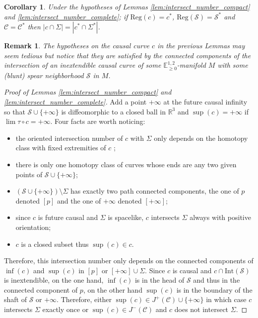 \documentclass[a4paper,12pt]{article}
\def\C{\mathcal C}
\def\S{\mathcal S}
\def\S{\mathcal{S}}
\def\RR{\mathbb{R}}
\newcommand{\mass}[1]{{\mathbb E}^{1,2}_{#1}}
\def\Reg{\mathrm{Reg}}
\def\reg{\Reg}
\newtheorem{corou}[lemou]{Corollary}
\newtheorem{remark}{Remark}             %
\begin{document}
    \begin{corou}\label{btzcor:intersect}\label{cor:intersect} Under the hypotheses of Lemmas \ref{lem:intersect_number_compact} and \ref{lem:intersect_number_complete}; if $\reg(c)=c^*$, $\reg(\S)=\S^*$ and $\C=\C^*$
    then $|c\cap \Sigma| = |c^*\cap\Sigma^*|$.
    \end{corou}
 \begin{remark}\label{btzrem:curve_spear}\label{rem:curve_spear} The hypotheses on the causal curve $c$ in the previous Lemmas may seem tedious but notice that they are satisfied by the connected components of the intersection of an inextendible causal curve of some $\mass{\geq0}$-manifold $M$ with some (blunt) spear neighborhood $\S$ in $M$. 
    \end{remark}
    \begin{proof}[Proof of Lemmas \ref{lem:intersect_number_compact} and \ref{lem:intersect_number_complete}]
     Add a point $+\infty$ at the future causal infinity so that $\S\cup\{+\infty\}$ is diffeomorphic to a closed ball in $\RR^3$ and $\sup(c)=+\infty$ if $\lim\tau\circ c = +\infty$. Four facts are worth noticing: 
     \begin{itemize}
      \item the oriented intersection number of $c$ with $\Sigma$ only depends on the homotopy class with fixed extremities of $c$ \cite{MR2680546};
      \item there is only one homotopy class of curves whose ends are any two given points of $\S\cup \{+\infty\}$; 
      \item $(\S\cup\{+\infty\})\setminus\Sigma$ has exactly two path connected components, the one of $p$ denoted $[p]$ and the one of $+\infty$ denoted $[+\infty]$;
      \item since $c$ is future causal and $\Sigma$ is spacelike, $c$ intersects $\Sigma$  always with positive orientation;
      \item $c$ is a closed subset thus $\sup(c)\in c$.
     \end{itemize}
      Therefore, this intersection number only depends on the connected components of $\inf(c)$ and $\sup(c)$ in $[p]$ or $[+\infty]\cup\Sigma$. Since $c$ is causal and $c\cap \mathrm{Int}(\S)$ is inextendible, on the one hand, $\inf(c)$ is in the head of $\S$ and thus in the connected component of $p$, on the other hand $\sup(c)$ is in the boundary of the shaft of $\S$ or $+\infty$. Therefore, either $\sup(c)\in J^+(\C)\cup\{+\infty\}$ in which case $c$ intersects $\Sigma$ exactly once or $\sup(c)\in J^-(\C)$ and  $c$ does not intersect $\Sigma$.
      

\end{proof}
\end{document}
